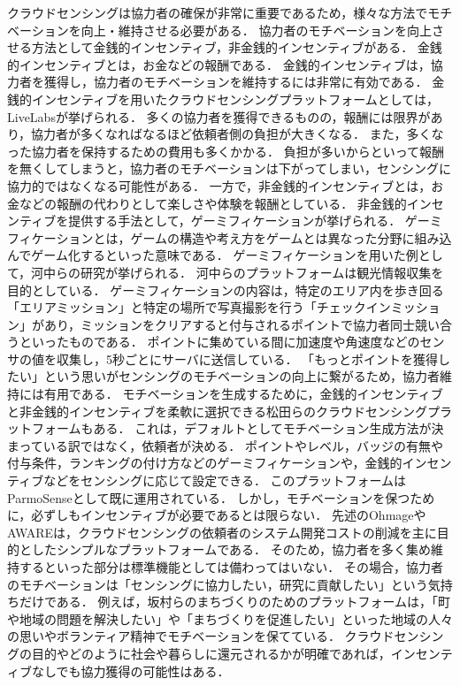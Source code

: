 クラウドセンシングは協力者の確保が非常に重要であるため，様々な方法でモチベーションを向上・維持させる必要がある．
協力者のモチベーションを向上させる方法として金銭的インセンティブ，非金銭的インセンティブがある．
金銭的インセンティブとは，お金などの報酬である．
金銭的インセンティブは，協力者を獲得し，協力者のモチベーションを維持するには非常に有効である．
金銭的インセンティブを用いたクラウドセンシングプラットフォームとしては，LiveLabs\cite{jaya}が挙げられる．
多くの協力者を獲得できるものの，報酬には限界があり，協力者が多くなればなるほど依頼者側の負担が大きくなる．
また，多くなった協力者を保持するための費用も多くかかる．
負担が多いからといって報酬を無くしてしまうと，協力者のモチベーションは下がってしまい，センシングに協力的ではなくなる可能性がある．
一方で，非金銭的インセンティブとは，お金などの報酬の代わりとして楽しさや体験を報酬としている．
非金銭的インセンティブを提供する手法として，ゲーミフィケーションが挙げられる\cite{ara}．
ゲーミフィケーションとは，ゲームの構造や考え方をゲームとは異なった分野に組み込んでゲーム化するといった意味である．
ゲーミフィケーションを用いた例として，河中らの研究\cite{kawa}が挙げられる．
河中らのプラットフォームは観光情報収集を目的としている．
ゲーミフィケーションの内容は，特定のエリア内を歩き回る「エリアミッション」と特定の場所で写真撮影を行う「チェックインミッション」があり，ミッションをクリアすると付与されるポイントで協力者同士競い合うといったものである．
ポイントに集めている間に加速度や角速度などのセンサの値を収集し，5秒ごとにサーバに送信している．
「もっとポイントを獲得したい」という思いがセンシングのモチベーションの向上に繋がるため，協力者維持には有用である．
モチベーションを生成するために，金銭的インセンティブと非金銭的インセンティブを柔軟に選択できる松田らのクラウドセンシングプラットフォーム\cite{matsu}もある．
これは，デフォルトとしてモチベーション生成方法が決まっている訳ではなく，依頼者が決める．
ポイントやレベル，バッジの有無や付与条件，ランキングの付け方などのゲーミフィケーションや，金銭的インセンティブなどをセンシングに応じて設定できる．
このプラットフォームはParmoSense\cite{Parmo}として既に運用されている．
しかし，モチベーションを保つために，必ずしもインセンティブが必要であるとは限らない．
先述のOhmageやAWAREは，クラウドセンシングの依頼者のシステム開発コストの削減を主に目的としたシンプルなプラットフォームである．
そのため，協力者を多く集め維持するといった部分は標準機能としては備わってはいない．
その場合，協力者のモチベーションは「センシングに協力したい，研究に貢献したい」という気持ちだけである．
例えば，坂村らのまちづくりのためのプラットフォーム\cite{mina}は，「町や地域の問題を解決したい」や「まちづくりを促進したい」といった地域の人々の思いやボランティア精神でモチベーションを保てている．
クラウドセンシングの目的やどのように社会や暮らしに還元されるかが明確であれば，インセンティブなしでも協力獲得の可能性はある．

